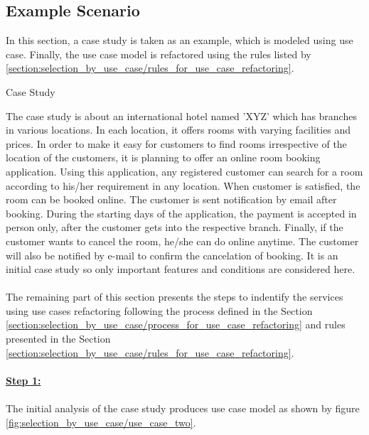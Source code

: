 \subsection{Example Scenario}\label{section:selection_by_use_case/refactoring_example}
In this section, a case study is taken as an example, which is modeled using use case. Finally, the use case model is refactored using the rules listed by \ref{section:selection_by_use_case/rules_for_use_case_refactoring}.
\\
\begin{shaded} Case Study \end{shaded}
The case study is about an international hotel named 'XYZ' which has branches in various locations. In each location, it offers rooms with varying facilities and prices. In order to make it easy for customers to find rooms irrespective of the location of the customers, it is planning to offer an online room booking application. Using this application, any registered customer can search for a room according to his/her requirement in any location. When customer is satisfied, the room can be booked online. The customer is sent notification by email after booking. During the starting days of the application, the payment is accepted in person only, after the customer gets into the respective branch. Finally, if the customer wants to cancel the room, he/she can do online anytime. The customer will also be notified by e-mail to confirm the cancelation of booking. It is an initial case study so only important features and conditions are considered here.
\\
\\
The remaining part of this section presents the steps to indentify the services using use cases refactoring following the process defined in the Section \ref{section:selection_by_use_case/process_for_use_case_refactoring} and rules presented in the Section \ref{section:selection_by_use_case/rules_for_use_case_refactoring}.
\\
\\
\textbf{\underline{Step 1:}}
\\
\\
The initial analysis of the case study produces use case model as shown by figure \ref{fig:selection_by_use_case/use_case_two}.

